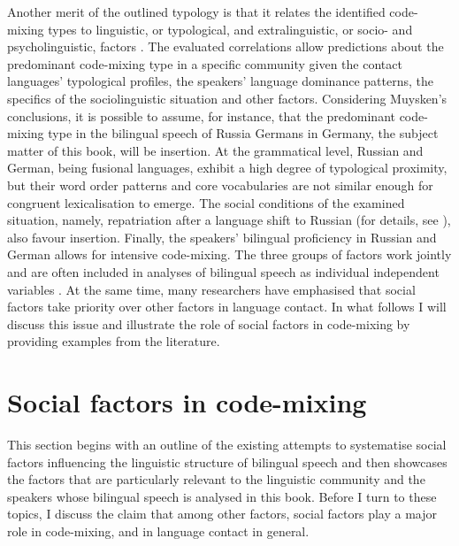 Another merit of the outlined typology is that it relates the identified code-mixing types to linguistic, or typological, and extralinguistic, or socio- and psycholinguistic, factors \citep[][221--249]{muysken-bilingual-2000}. The evaluated correlations allow predictions about the predominant code-mixing type in a specific community given the contact languages' typological profiles, the speakers' language dominance patterns, the specifics of the sociolinguistic situation and other factors. Considering Muysken's conclusions, it is possible to assume, for instance, that the predominant code-mixing type in the bilingual speech of Russia Germans in Germany, the subject matter of this book, will be insertion. At the grammatical level, Russian and German, being fusional languages, exhibit a high degree of typological proximity, but their word order patterns and core vocabularies are not similar enough for congruent lexicalisation to emerge. The social conditions of the examined situation, namely, repatriation after a language shift to Russian (for details, see ), also favour insertion. Finally, the speakers' bilingual proficiency in Russian and German allows for intensive code-mixing. The three groups of factors work jointly and are often included in analyses of bilingual speech as individual independent variables \citep[cf.][]{muysken-etal96}. At the same time, many researchers have emphasised that social factors take priority over other factors in language contact. In what follows I will discuss this issue and illustrate the role of social factors in code-mixing by providing examples from the literature.

\section{Social factors in code-mixing}
This section begins with an outline of the existing attempts to systematise  social factors influencing the linguistic structure of bilingual speech and then showcases the factors that are particularly relevant to the linguistic community and the speakers whose bilingual speech is analysed in this book. Before I turn to these topics, I discuss the claim that among other factors, social factors play a major role in code-mixing, and in language contact in general.
 

